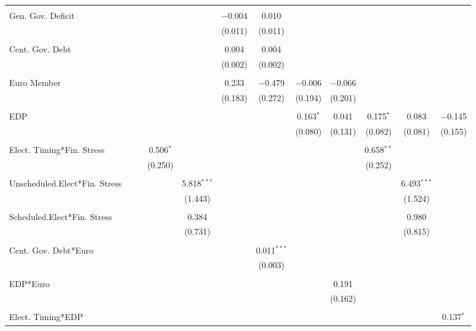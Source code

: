 \begin{table}[!htbp]
\begin{tabular}{@{\extracolsep{5pt}}lccccccccccc}
  & & & & & & & & & & & \\ 
 Gen. Gov. Deficit &  &  &  &  & $-$0.004 & 0.010 &  &  &  &  &  \\ 
  &  &  &  &  & (0.011) & (0.011) &  &  &  &  &  \\ 
  & & & & & & & & & & & \\ 
 Cent. Gov. Debt &  &  &  &  & 0.004 & 0.004 &  &  &  &  &  \\ 
  &  &  &  &  & (0.002) & (0.002) &  &  &  &  &  \\ 
  & & & & & & & & & & & \\ 
 Euro Member &  &  &  &  & 0.233 & $-$0.479 & $-$0.006 & $-$0.066 &  &  &  \\ 
  &  &  &  &  & (0.183) & (0.272) & (0.194) & (0.201) &  &  &  \\ 
  & & & & & & & & & & & \\ 
 EDP &  &  &  &  &  &  & 0.163$^{*}$ & 0.041 & 0.175$^{*}$ & 0.083 & $-$0.145 \\ 
  &  &  &  &  &  &  & (0.080) & (0.131) & (0.082) & (0.081) & (0.155) \\ 
  & & & & & & & & & & & \\ 
 Elect. Timing*Fin. Stress &  &  & 0.506$^{*}$ &  &  &  &  &  & 0.658$^{**}$ &  &  \\ 
  &  &  & (0.250) &  &  &  &  &  & (0.252) &  &  \\ 
  & & & & & & & & & & & \\ 
 Unscheduled.Elect*Fin. Stress &  &  &  & 5.818$^{***}$ &  &  &  &  &  & 6.493$^{***}$ &  \\ 
  &  &  &  & (1.443) &  &  &  &  &  & (1.524) &  \\ 
  & & & & & & & & & & & \\ 
 Scheduled.Elect*Fin. Stress &  &  &  & 0.384 &  &  &  &  &  & 0.980 &  \\ 
  &  &  &  & (0.731) &  &  &  &  &  & (0.815) &  \\ 
  & & & & & & & & & & & \\ 
 Cent. Gov. Debt*Euro &  &  &  &  &  & 0.011$^{***}$ &  &  &  &  &  \\ 
  &  &  &  &  &  & (0.003) &  &  &  &  &  \\ 
  & & & & & & & & & & & \\ 
 EDP*Euro &  &  &  &  &  &  &  & 0.191 &  &  &  \\ 
  &  &  &  &  &  &  &  & (0.162) &  &  &  \\ 
  & & & & & & & & & & & \\ 
 Elect. Timing*EDP &  &  &  &  &  &  &  &  &  &  & 0.137$^{*}$ \\ 

\end{tabular}
\end{table}
